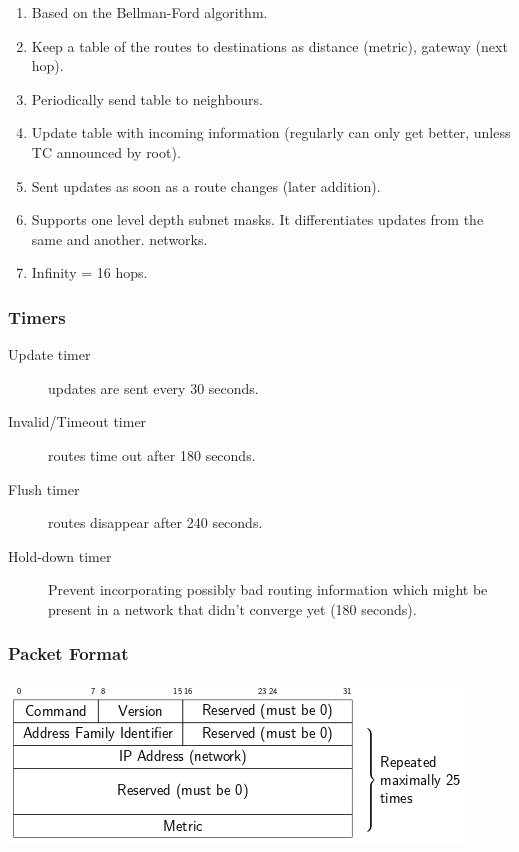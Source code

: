 \documentclass{article}
\begin{document}
\begin{enumerate}
	\item Based on the Bellman-Ford algorithm.
	\item Keep a table of the routes to destinations as {distance (metric), gateway (next hop)}.
	\item Periodically send table to neighbours.
	\item Update table with incoming information (regularly can only get better, unless TC announced by root).
	\item Sent updates as soon as a route changes (later addition).
	\item Supports one level depth subnet masks. It differentiates updates from the same and another. networks.
	\item Infinity = 16 hops.
\end{enumerate}
	
\subsubsection{Timers}
	
\begin{description}
	\item[Update timer] updates are sent every 30 seconds.
	\item[Invalid/Timeout timer] routes time out after 180 seconds.
	\item[Flush timer] routes disappear after 240 seconds.
	\item[Hold-down timer] Prevent incorporating possibly bad routing information
which might be present in a network that didn’t converge yet (180 seconds).
\end{description}

\subsubsection{Packet Format}

\centerline{\includegraphics[scale=0.6]{images/RIPv1.png}\\[1cm]}
\end{document}
